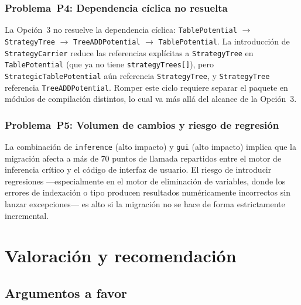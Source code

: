 \documentclass[11pt,a4paper]{article}
\newcommand{\code}[1]{\texttt{#1}}
\begin{document}
\subsubsection{Problema~P4: Dependencia cíclica no resuelta}

La Opción~3 no resuelve la dependencia cíclica:
\code{TablePotential} $\to$ \code{StrategyTree} $\to$ \code{TreeADDPotential}
$\to$ \code{TablePotential}.  La introducción de \code{StrategyCarrier} reduce
las referencias explícitas a \code{StrategyTree} en \code{TablePotential} (que
ya no tiene \code{strategyTrees[]}), pero \code{StrategicTablePotential} aún
referencia \code{StrategyTree}, y \code{StrategyTree} referencia
\code{TreeADDPotential}.  Romper este ciclo requiere separar el paquete en
módulos de compilación distintos, lo cual va más allá del alcance de la
Opción~3.

\subsubsection{Problema~P5: Volumen de cambios y riesgo de regresión}

La combinación de \code{inference} (alto impacto) y \code{gui} (alto impacto)
implica que la migración afecta a más de 70 puntos de llamada repartidos
entre el motor de inferencia crítico y el código de interfaz de usuario.
El riesgo de introducir regresiones ---especialmente en el motor de eliminación
de variables, donde los errores de indexación o tipo producen resultados
numéricamente incorrectos sin lanzar excepciones--- es alto si la migración
no se hace de forma estrictamente incremental.

\section{Valoración y recomendación}
\label{sec:op3-recomendacion}

\subsection{Argumentos a favor}
\end{document}
